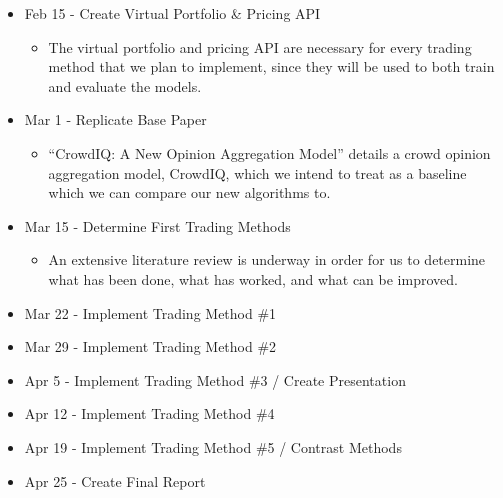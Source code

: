 \begin{itemize}
\item Feb 15 - Create Virtual Portfolio \& Pricing API
  \begin{itemize}
  \item The virtual portfolio and pricing API are necessary for every trading method that we plan to implement, since they will be used to both train and evaluate the models.
  \end{itemize}
\item Mar 1 - Replicate Base Paper
  \begin{itemize}
  \item “CrowdIQ: A New Opinion Aggregation Model” details a crowd opinion aggregation model, CrowdIQ, which we intend to treat as a baseline which we can compare our new algorithms to.
  \end{itemize}
\item Mar 15 - Determine First Trading Methods
  \begin{itemize}
    \item An extensive literature review is underway in order for us to determine what has been done, what has worked, and what can be improved.
  \end{itemize}
\item Mar 22 - Implement Trading Method \#1
\item Mar 29 - Implement Trading Method \#2
\item Apr 5 - Implement Trading Method \#3 / Create Presentation
\item Apr 12 - Implement Trading Method \#4
\item Apr 19 - Implement Trading Method \#5 / Contrast Methods
\item Apr 25 - Create Final Report
\end{itemize}


